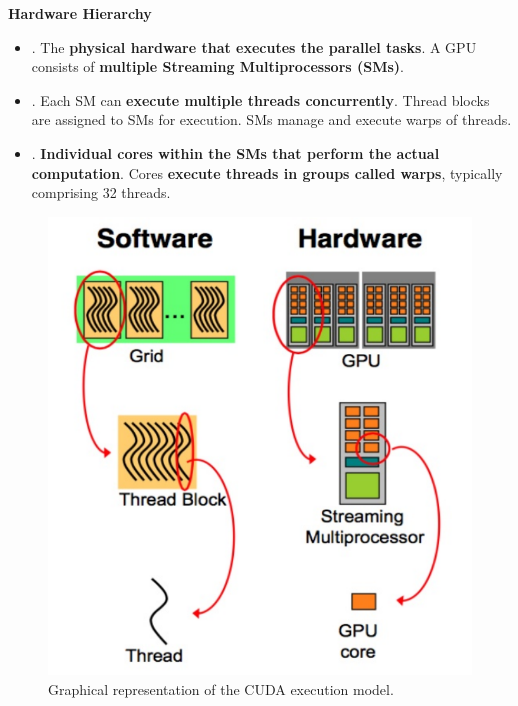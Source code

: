 \begin{flushleft}
    \textcolor{Green3}{ \textbf{Hardware Hierarchy}}
\end{flushleft}
\begin{itemize}
    \item {}. The \textbf{physical hardware that executes the parallel tasks}. A GPU consists of \textbf{multiple Streaming Multiprocessors (SMs)}.

    \item {}. Each SM can \textbf{execute multiple threads concurrently}. Thread blocks are assigned to SMs for execution. SMs manage and execute warps of threads.

    \item {}. \textbf{Individual cores within the SMs that perform the actual computation}. Cores \textbf{execute threads in groups called warps}, typically comprising 32 threads.
\end{itemize}
\begin{figure}[!htp]
    \centering
    \includegraphics[width=.5\textwidth]{img/cuda-execution-model-1.pdf}
    \caption{Graphical representation of the CUDA execution model.}
\end{figure}

